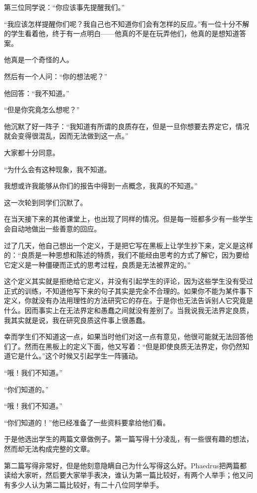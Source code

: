 \documentclass[UTF8]{article}
\begin{document}
\par 第三位同学说：“你应该事先提醒我们。”
\par “我应该怎样提醒你们呢？我自己也不知道你们会有怎样的反应。”有一位十分不解的学生看着他，终于有一点明白——他真的不是在玩弄他们，他真的是想知道答案。
\par 他真是一个奇怪的人。
\par 然后有一个人问：“你的想法呢？”
\par 他回答：“我不知道。”
\par “但是你究竟怎么想呢？”
\par 他沉默了好一阵子：“我知道有所谓的良质存在，但是一旦你想要去界定它，情况就会变得很混乱，因而无法做到这一点。”
\par 大家都十分同意。
\par “为什么会有这种现象，我不知道。
\par 我想或许我能够从你们的报告中得到一点概念，我真的不知道。”
\par 这一次轮到同学们沉默了。
\par 在当天接下来的其他课堂上，也出现了同样的情况。但是每一班都多少有一些学生会自动地做出一些善意的回应。
\par 过了几天，他自己想出一个定义，于是把它写在黑板上让学生抄下来，定义是这样的：“良质是一种思想和陈述的特质，我们不能经由思考的方式了解它，因为要给它定义是一种僵硬而正式的思考过程，良质是无法被界定的。”
\par 这个定义其实就是拒绝给它定义，并没有引起学生的评论，因为这些学生没有受过正式的训练，不知道他写下来的句子其实是完全不合理的。如果你不能为某件事下定义，你就没有办法用理性的方法研究它的存在。于是你也无法告诉别人它究竟是什么。因而事实上在无法界定和愚蠢之间就没有差别了。当我说我无法界定良质，我其实就是说，我在研究良质这件事上很愚蠢。
\par 幸而学生们不知道这一点，如果当时他们对这一点有意见，他很可能就无法回答他们了。然而在黑板上的定义下面，他又写着：“但是即使良质无法界定，你仍然知道它是什么。”这个时候又引起学生一阵骚动。
\par “哦！我们不知道。”
\par “你们知道的。”
\par “哦！我们不知道。”
\par “你们知道的！”他已经准备了一些资料要拿给他们看。
\par 于是他选出学生的两篇文章做例子。第一篇写得十分凌乱，有一些很有趣的想法，然而却无法构成完整的文章。
\par 第二篇写得非常好，但是他刻意隐瞒自己为什么写得这么好。Phaedrus把两篇都读给大家听，然后要大家举手表决，谁认为第一篇比较好，有两个人举手；他又问有多少人认为第二篇比较好，有二十八位同学举手。
\end{document}
